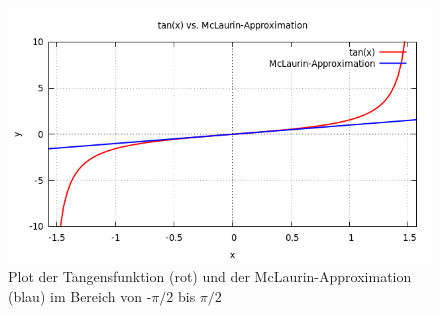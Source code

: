 \documentclass[18pt,a4paper]{article}
\begin{document}
\newpage
\begin{figure}[t]
	\centering
	\includegraphics[width=1\linewidth]{plots/output}
	\caption{Plot der Tangensfunktion (rot) und der McLaurin-Approximation (blau) im Bereich von -$\pi/2$ bis $\pi/2$}
	\label{fig:output}
\end{figure}

\null
\vfill
\end{document}
